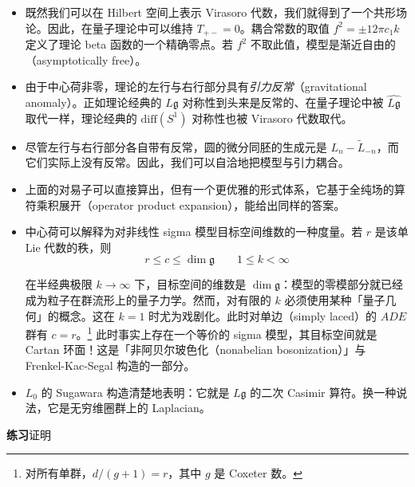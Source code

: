\begin{itemize}
  \item 既然我们可以在 Hilbert 空间上表示 Virasoro 代数，我们就得到了一个共形场论。因此，在量子理论中可以维持 $T_{+-}=0$。耦合常数的取值 $f^2=\pm12\pi c_1 k$ 定义了理论 beta 函数的一个精确零点。若 $f^2$ 不取此值，模型是渐近自由的（asymptotically free）。
  \item 由于中心荷非零，理论的左行与右行部分具有\emph{引力反常}（gravitational anomaly）。正如理论经典的 $L\mathfrak{g}$ 对称性到头来是反常的、在量子理论中被 $\widehat{L\mathfrak{g}}$ 取代一样，理论经典的 $\mathrm{diff}(S^1)$ 对称性也被 Virasoro 代数取代。
  \item 尽管左行与右行部分各自带有反常，圆的微分同胚的生成元是 $L_n-\tilde L_{-n}$，而它们实际上没有反常。因此，我们可以自洽地把模型与引力耦合。
  \item 上面的对易子可以直接算出，但有一个更优雅的形式体系，它基于全纯场的算符乘积展开（operator product expansion），能给出同样的答案。


  \item 中心荷可以解释为对非线性 sigma 模型目标空间维数的一种度量。若 $r$ 是该单 Lie 代数的秩，则
  \begin{equation}
    r\le c\le\dim\mathfrak{g}\qquad 1\le k<\infty
    \tag{4.88}
    \label{eq:4.88}
  \end{equation}

  在半经典极限 $k\to\infty$ 下，目标空间的维数是 $\dim\mathfrak{g}$：模型的零模部分就已经成为粒子在群流形上的量子力学。然而，对有限的 $k$ 必须使用某种「量子几何」的概念。这在 $k=1$ 时尤为戏剧化。此时对单边（simply laced）的 $ADE$ 群有 $c=r$。\footnote{对所有单群，$d/(g+1)=r$，其中 $g$ 是 Coxeter 数。} 此时事实上存在一个等价的 sigma 模型，其目标空间就是 Cartan 环面！这是「非阿贝尔玻色化（nonabelian bosonization）」与 Frenkel-Kac-Segal 构造的一部分。

  \item $L_0$ 的 Sugawara 构造清楚地表明：它就是 $L\mathfrak{g}$ 的二次 Casimir 算符。换一种说法，它是无穷维圈群上的 Laplacian。
\end{itemize}

\medskip\noindent\textbf{练习}\quad 证明


